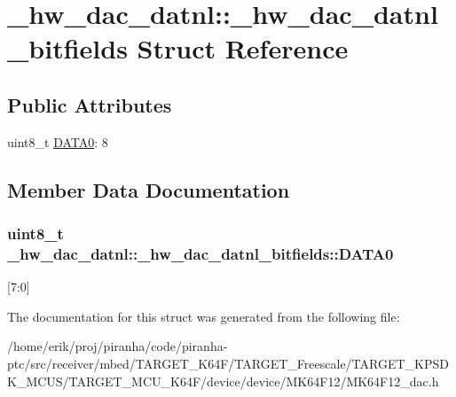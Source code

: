 \hypertarget{struct__hw__dac__datnl_1_1__hw__dac__datnl__bitfields}{}\section{\+\_\+hw\+\_\+dac\+\_\+datnl\+:\+:\+\_\+hw\+\_\+dac\+\_\+datnl\+\_\+bitfields Struct Reference}
\label{struct__hw__dac__datnl_1_1__hw__dac__datnl__bitfields}
\subsection*{Public Attributes}
\begin{DoxyCompactItemize}
\item 
uint8\+\_\+t \hyperlink{struct__hw__dac__datnl_1_1__hw__dac__datnl__bitfields_a361efaef02786a557a8588beee938da2}{D\+A\+T\+A0}\+: 8
\end{DoxyCompactItemize}


\subsection{Member Data Documentation}
\subsubsection[{\texorpdfstring{D\+A\+T\+A0}{DATA0}}]{\setlength{\rightskip}{0pt plus 5cm}uint8\+\_\+t \+\_\+hw\+\_\+dac\+\_\+datnl\+::\+\_\+hw\+\_\+dac\+\_\+datnl\+\_\+bitfields\+::\+D\+A\+T\+A0}\hypertarget{struct__hw__dac__datnl_1_1__hw__dac__datnl__bitfields_a361efaef02786a557a8588beee938da2}{}\label{struct__hw__dac__datnl_1_1__hw__dac__datnl__bitfields_a361efaef02786a557a8588beee938da2}
\mbox{[}7\+:0\mbox{]} 

The documentation for this struct was generated from the following file\+:\begin{DoxyCompactItemize}
\item 
/home/erik/proj/piranha/code/piranha-\/ptc/src/receiver/mbed/\+T\+A\+R\+G\+E\+T\+\_\+\+K64\+F/\+T\+A\+R\+G\+E\+T\+\_\+\+Freescale/\+T\+A\+R\+G\+E\+T\+\_\+\+K\+P\+S\+D\+K\+\_\+\+M\+C\+U\+S/\+T\+A\+R\+G\+E\+T\+\_\+\+M\+C\+U\+\_\+\+K64\+F/device/device/\+M\+K64\+F12/M\+K64\+F12\+\_\+dac.\+h\end{DoxyCompactItemize}
